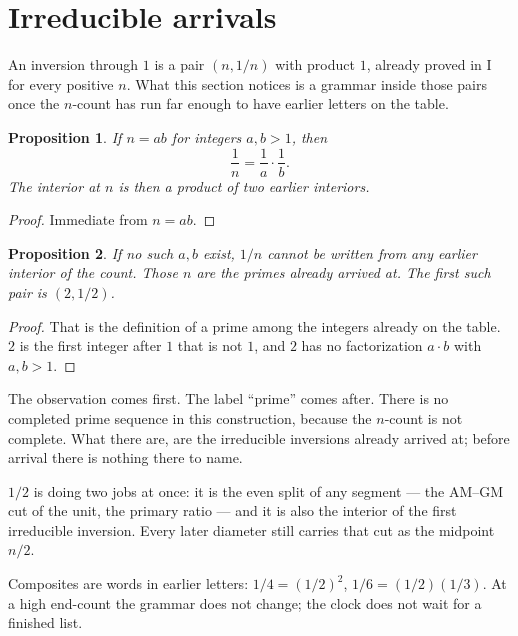 \documentclass[10pt,a4paper]{article}
\theoremstyle{plain}
\newtheorem{proposition}{Proposition}
\theoremstyle{definition}
\theoremstyle{remark}
\begin{document}
\section{Irreducible arrivals}

An inversion through $1$ is a pair $(n,1/n)$ with product $1$, already proved in I for every positive $n$.
What this section notices is a grammar inside those pairs once the $n$-count has run far enough to have earlier letters on the table.

\begin{proposition}
\label{prop:reducible}
If $n=ab$ for integers $a,b>1$, then
\[
\frac1n=\frac1a\cdot\frac1b.
\]
The interior at $n$ is then a product of two earlier interiors.
\end{proposition}

\begin{proof}
Immediate from $n=ab$.
\end{proof}

\begin{proposition}
\label{prop:irreducible}
If no such $a,b$ exist, $1/n$ cannot be written from any earlier interior of the count.
Those $n$ are the primes already arrived at.
The first such pair is $(2,1/2)$.
\end{proposition}

\begin{proof}
That is the definition of a prime among the integers already on the table.
$2$ is the first integer after $1$ that is not $1$, and $2$ has no factorization $a\cdot b$ with $a,b>1$.
\end{proof}

The observation comes first.
The label ``prime'' comes after.
There is no completed prime sequence in this construction, because the $n$-count is not complete.
What there are, are the irreducible inversions already arrived at; before arrival there is nothing there to name.

$1/2$ is doing two jobs at once: it is the even split of any segment --- the AM--GM cut of the unit, the primary ratio --- and it is also the interior of the first irreducible inversion.
Every later diameter still carries that cut as the midpoint $n/2$.

Composites are words in earlier letters: $1/4=(1/2)^{2}$, $1/6=(1/2)(1/3)$.
At a high end-count the grammar does not change; the clock does not wait for a finished list.
\end{document}
